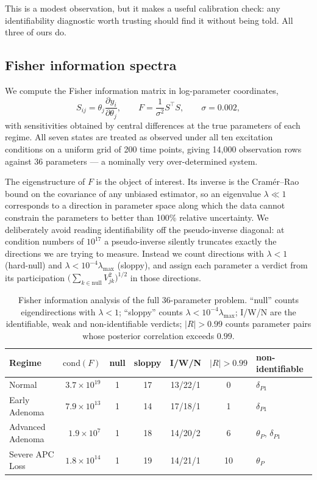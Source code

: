 \documentclass[11pt]{article}
\newcommand{\thP}{\theta_P}
\begin{document}
This is a modest observation, but it makes a useful calibration check: any
identifiability diagnostic worth trusting should find it without being told. All
three of ours do.

\subsection{Fisher information spectra}

We compute the Fisher information matrix in log-parameter coordinates,
\begin{equation}
S_{ij} = \theta_j\frac{\partial y_i}{\partial \theta_j},
\qquad
F = \frac{1}{\sigma^2}S^\top S,
\qquad \sigma = 0.002,
\end{equation}
with sensitivities obtained by central differences at the true parameters of
each regime. All seven states are treated as observed under all ten excitation
conditions on a uniform grid of 200 time points, giving 14,000 observation
rows against 36 parameters --- a nominally very over-determined system.

The eigenstructure of $F$ is the object of interest. Its inverse is the
Cramér--Rao bound on the covariance of any unbiased estimator, so an eigenvalue
$\lambda \ll 1$ corresponds to a direction in parameter space along which the
data cannot constrain the parameters to better than 100\% relative
uncertainty. We deliberately avoid reading identifiability off the
pseudo-inverse diagonal: at condition numbers of $10^{17}$ a pseudo-inverse
silently truncates exactly the directions we are trying to measure. Instead we
count directions with $\lambda < 1$ (hard-null) and $\lambda < 10^{-4}\lambda_{\max}$
(sloppy), and assign each parameter a verdict from its participation
$\big(\sum_{k\in\text{null}}V_{jk}^2\big)^{1/2}$ in those directions.

\begin{table}[H]
\centering
\small
\begin{tabular}{lrccccl}
\toprule
\textbf{Regime} & $\mathrm{cond}(F)$ & \textbf{null} & \textbf{sloppy} &
\textbf{I/W/N} & $|R|>0.99$ & \textbf{non-identifiable} \\
\midrule
Normal            & $3.7\times10^{19}$ & 1 & 17 & 13/22/1 & 0  & $\delta_{P1}$ \\
Early Adenoma     & $7.9\times10^{13}$ & 1 & 14 & 17/18/1 & 1  & $\delta_{P1}$ \\
Advanced Adenoma  & $1.9\times10^{7}$  & 1 & 18 & 14/20/2 & 6  & $\thP$, $\delta_{P1}$ \\
Severe APC Loss   & $1.8\times10^{14}$ & 1 & 19 & 14/21/1 & 10 & $\thP$ \\
\bottomrule
\end{tabular}
\caption{Fisher information analysis of the full 36-parameter problem. ``null''
counts eigendirections with $\lambda<1$; ``sloppy'' counts
$\lambda<10^{-4}\lambda_{\max}$; I/W/N are the identifiable, weak and
non-identifiable verdicts; $|R|>0.99$ counts parameter pairs whose posterior
correlation exceeds $0.99$.}
\label{tab:fim}
\end{table}
\end{document}
